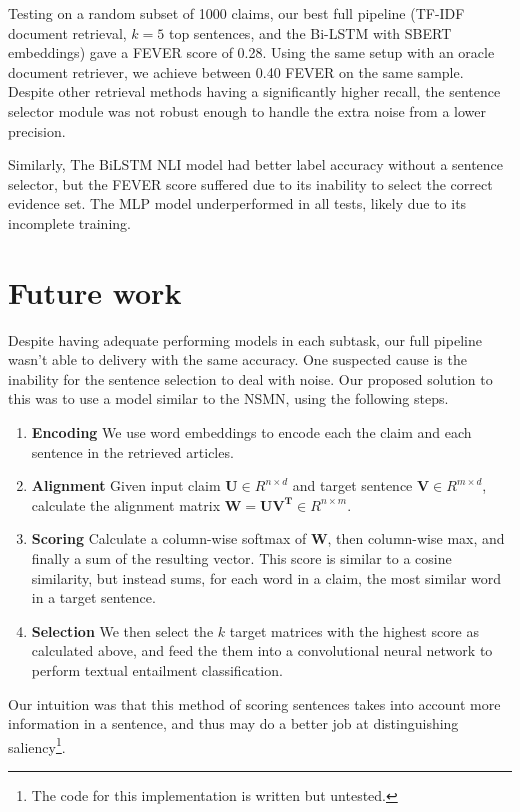 \documentclass[11pt,a4paper]{article}
\begin{document}
Testing on a random subset of 1000 claims, our best full pipeline (TF-IDF document retrieval,
$k=5$ top sentences, and the Bi-LSTM with SBERT embeddings) gave a FEVER score of 0.28.
Using the same setup with an oracle document retriever, we achieve between 0.40 FEVER on the same sample. Despite other retrieval methods having a significantly higher recall, the sentence selector module was not robust enough to handle the extra noise from a lower precision.

Similarly, The BiLSTM NLI model had better label accuracy without a sentence selector, but the FEVER score suffered due to its inability to select the correct evidence set. The MLP model underperformed in all tests, likely due to its incomplete training.

\section{Future work}

Despite having adequate performing models in each subtask, our full pipeline wasn't able to delivery with the same accuracy. One suspected cause is the inability for the sentence selection to deal with noise. Our proposed solution to this was to use a model similar to the NSMN, using the following steps.
\begin{enumerate}
        \setlength{\itemsep}{0pt}
        \setlength{\parskip}{0pt}
  \item \textbf{Encoding} We use word embeddings to encode each the claim and each sentence in the retrieved articles.
  \item \textbf{Alignment} Given input claim $\mathbf{U}\in R^{n \times d}$ and target sentence $\mathbf{V} \in R^{m \times d}$, calculate the alignment matrix $\mathbf{W=UV^{T}} \in R^{n \times m}$.
  \item \textbf{Scoring} Calculate a column-wise softmax of $\mathbf{W}$, then column-wise max, and finally a sum of the resulting vector. This score is similar to a cosine similarity, but instead sums, for each word in a claim, the most similar word in a target sentence.
  \item \textbf{Selection} We then select the $k$ target matrices with the highest score as calculated above, and feed the them into a convolutional neural network to perform textual entailment classification.
\end{enumerate}

Our intuition was that this method of scoring sentences takes into account more information in a sentence, and thus may do a better job at distinguishing saliency\footnote{The code for this implementation is written but untested.}.
\end{document}

